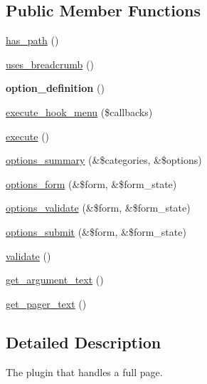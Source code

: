 \subsection*{Public Member Functions}
\begin{DoxyCompactItemize}
\item 
\hyperlink{classviews__plugin__display__page_a6ab3df375279fc7308aea96e3f08f833}{has\_\-path} ()
\item 
\hyperlink{classviews__plugin__display__page_acbdafb32168f809b28e083d654399f3f}{uses\_\-breadcrumb} ()
\item 
\hypertarget{classviews__plugin__display__page_a19b25a55cb43755a944d1f37c0180ff4}{
{\bfseries option\_\-definition} ()}
\label{classviews__plugin__display__page_a19b25a55cb43755a944d1f37c0180ff4}

\item 
\hyperlink{classviews__plugin__display__page_a92137bfe76641bd6c50e7d8b81108b91}{execute\_\-hook\_\-menu} (\$callbacks)
\item 
\hyperlink{classviews__plugin__display__page_a943b71fc873e5d09f548b69ba314b674}{execute} ()
\item 
\hyperlink{classviews__plugin__display__page_a47de087f3201600b057e0d4a55eef48c}{options\_\-summary} (\&\$categories, \&\$options)
\item 
\hyperlink{classviews__plugin__display__page_aa8267a4774b92a7b47a3768ac98aac36}{options\_\-form} (\&\$form, \&\$form\_\-state)
\item 
\hyperlink{classviews__plugin__display__page_a192c8feb8740fdb389600fb7a8588c27}{options\_\-validate} (\&\$form, \&\$form\_\-state)
\item 
\hyperlink{classviews__plugin__display__page_a9b03d35a15fcfcae4a474ea56b6ca5b6}{options\_\-submit} (\&\$form, \&\$form\_\-state)
\item 
\hyperlink{classviews__plugin__display__page_a995cf48d67e20ef897d931fcbba391d1}{validate} ()
\item 
\hyperlink{classviews__plugin__display__page_ae3056e57372089c08fb50d85fbfaea49}{get\_\-argument\_\-text} ()
\item 
\hyperlink{classviews__plugin__display__page_aca620130dea055b599b405845627f3f0}{get\_\-pager\_\-text} ()
\end{DoxyCompactItemize}


\subsection{Detailed Description}
The plugin that handles a full page. 

